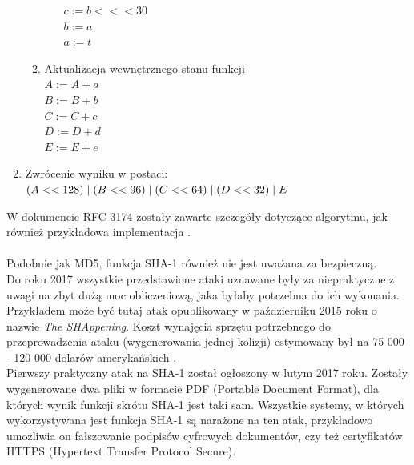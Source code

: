 \begin{enumerate}
\begin{enumerate}
\begin{enumerate}
				        $c := b <<< 30$\\
				        $b := a$ \\
				        $a := t$
				\end{enumerate}
			\item Aktualizacja wewnętrznego stanu funkcji \\
				$A := A + a$ \\
				$B := B + b$ \\
				$C := C + c$ \\
				$D := D + d$ \\
				$E := E + e$
		\end{enumerate}
	\item Zwrócenie wyniku w postaci: \\
		$(A << 128) \mathrel{|} (B << 96) \mathrel{|} (C << 64) \mathrel{|} (D << 32) \mathrel{|} E$
\end{enumerate}
W dokumencie RFC 3174 zostały zawarte szczegóły dotyczące algorytmu, jak również przykładowa implementacja \cite{sha1rfc}. \\ \\
Podobnie jak MD5, funkcja SHA-1 również nie jest uważana za bezpieczną. \\
Do roku 2017 wszystkie przedstawione ataki uznawane były za niepraktyczne z uwagi na zbyt dużą moc obliczeniową, jaka byłaby potrzebna do ich wykonania.
Przykładem może być tutaj atak opublikowany w październiku 2015 roku o nazwie \textit{The SHAppening}. Koszt wynajęcia sprzętu potrzebnego do przeprowadzenia ataku (wygenerowania jednej kolizji) estymowany był na 75 000 - 120 000 dolarów amerykańskich \cite{shap}. \\
Pierwszy praktyczny atak na SHA-1 został ogłoszony w lutym 2017 roku. Zostały wygenerowane dwa pliki w formacie PDF (Portable Document Format), dla których wynik funkcji skrótu SHA-1 jest taki sam. Wszystkie systemy, w których wykorzystywana jest funkcja SHA-1 są narażone na ten atak, przykładowo umożliwia on fałszowanie podpisów cyfrowych dokumentów, czy też certyfikatów HTTPS (Hypertext Transfer Protocol Secure). \cite{shatt}

